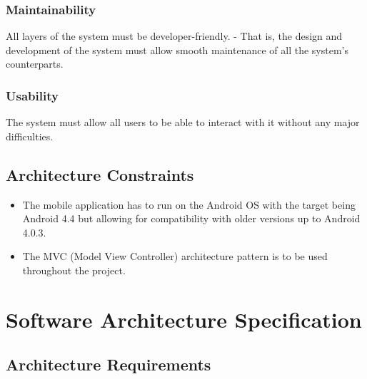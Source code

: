\documentclass[12pt]{article}
\begin{document}
               					\subsubsection{Maintainability}
					                  	All layers of the system must be developer-friendly. - That is, the design and development of the system must allow smooth maintenance of all the system's counterparts.
       						    
       						    \subsubsection{Usability}
			    	                  	The system must allow all users to be able to interact with it without any major difficulties.
       						    	                  	
                
                		\subsection{Architecture Constraints}
                				
                				\begin{itemize}
                						\item The mobile application has to run on the Android OS with the target being Android 4.4 but allowing for compatibility with older versions up to Android 4.0.3. 
                						\item The MVC (Model View Controller) architecture pattern is to be used throughout the project.
                				\end{itemize}
               
                \section{Software Architecture Specification}
                
               		 \subsection{Architecture Requirements}
               		   
\end{document}
